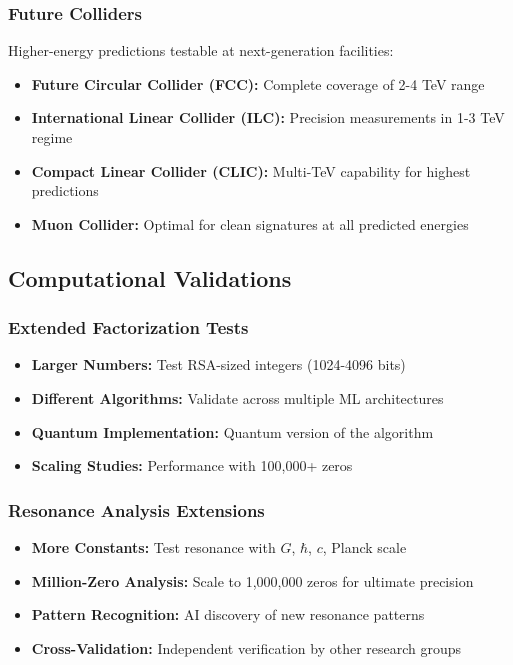 \documentclass[12pt, a4paper]{article}
\begin{document}
\subsubsection{Future Colliders}
Higher-energy predictions testable at next-generation facilities:
\begin{itemize}
    \item \textbf{Future Circular Collider (FCC):} Complete coverage of 2-4 TeV range
    \item \textbf{International Linear Collider (ILC):} Precision measurements in 1-3 TeV regime
    \item \textbf{Compact Linear Collider (CLIC):} Multi-TeV capability for highest predictions
    \item \textbf{Muon Collider:} Optimal for clean signatures at all predicted energies
\end{itemize}

\subsection{Computational Validations}
\subsubsection{Extended Factorization Tests}
\begin{itemize}
    \item \textbf{Larger Numbers:} Test RSA-sized integers (1024-4096 bits)
    \item \textbf{Different Algorithms:} Validate across multiple ML architectures
    \item \textbf{Quantum Implementation:} Quantum version of the algorithm
    \item \textbf{Scaling Studies:} Performance with 100,000+ zeros
\end{itemize}

\subsubsection{Resonance Analysis Extensions}
\begin{itemize}
    \item \textbf{More Constants:} Test resonance with $G$, $\hbar$, $c$, Planck scale
    \item \textbf{Million-Zero Analysis:} Scale to 1,000,000 zeros for ultimate precision
    \item \textbf{Pattern Recognition:} AI discovery of new resonance patterns
    \item \textbf{Cross-Validation:} Independent verification by other research groups
\end{itemize}
\end{document}
